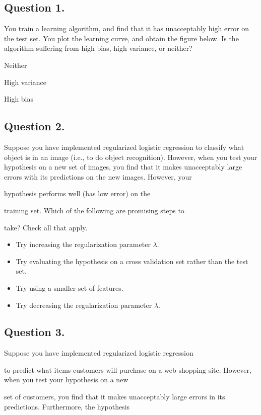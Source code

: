 \subsection*{Question 1. }
You train a learning algorithm, and find that it has unacceptably high error on the test set. You plot the learning curve, and obtain the figure below. Is the algorithm suffering from high bias, high variance, or neither?



Neither

High variance

High bias
\subsection*{Question 2. }
Suppose you have implemented regularized logistic regression  to classify what object is in an image (i.e., to do object recognition). However, when you test your hypothesis on a new set of images, you find that it makes unacceptably large 
errors with its predictions on the new images. However, your

hypothesis performs well (has low error) on the

training set. Which of the following are promising steps to

take? Check all that apply.

\begin{itemize}
\item 
Try increasing the regularization parameter $\lambda$.
\item 
Try evaluating the hypothesis on a cross validation set rather than the test set.
\item 
Try using a smaller set of features.
\item 
Try decreasing the regularization parameter $\lambda$.
\end{itemize}
\subsection*{Question 3. }
Suppose you have implemented regularized logistic regression

to predict what items customers will purchase on a web shopping site. However, when you test your hypothesis on a new

set of customers, you find that it makes unacceptably large errors in its predictions. Furthermore, the hypothesis

